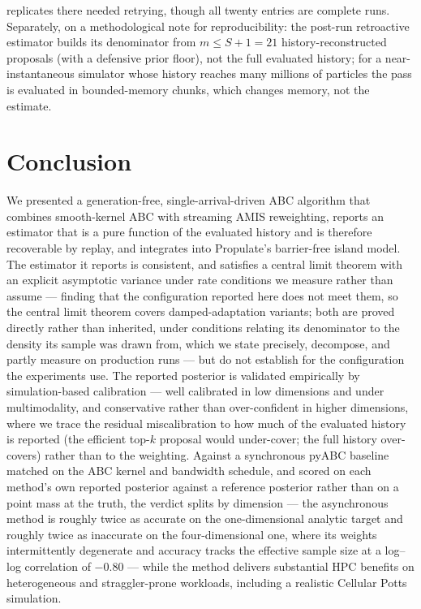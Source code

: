 replicates there needed retrying, though all twenty entries are complete runs. Separately, on a methodological note for reproducibility: the post-run retroactive estimator builds its denominator from $m\le S{+}1=21$ history-reconstructed proposals (with a defensive prior floor), not the full evaluated history; for a near-instantaneous simulator whose history reaches many millions of particles the pass is evaluated in bounded-memory chunks, which changes memory, not the estimate.

\section{Conclusion}\label{sec:conclusion}
We presented a generation-free, single-arrival-driven ABC algorithm that combines smooth-kernel ABC with streaming AMIS reweighting, reports an estimator that is a pure function of the evaluated history and is therefore recoverable by replay, and integrates into Propulate's barrier-free island model. The estimator it reports is consistent, and satisfies a central limit theorem with an explicit asymptotic variance under rate conditions we measure rather than assume --- finding that the configuration reported here does not meet them, so the central limit theorem covers damped-adaptation variants; both are proved directly rather than inherited, under conditions relating its denominator to the density its sample was drawn from, which we state precisely, decompose, and partly measure on production runs --- but do not establish for the configuration the experiments use. The reported posterior is validated empirically by simulation-based calibration --- well calibrated in low dimensions and under multimodality, and conservative rather than over-confident in higher dimensions, where we trace the residual miscalibration to how much of the evaluated history is reported (the efficient top-$k$ proposal would under-cover; the full history over-covers) rather than to the weighting. Against a synchronous pyABC baseline matched on the ABC kernel and bandwidth schedule, and scored on each method's own reported posterior against a reference posterior rather than on a point mass at the truth, the verdict splits by dimension --- the asynchronous method is roughly twice as accurate on the one-dimensional analytic target and roughly twice as inaccurate on the four-dimensional one, where its weights intermittently degenerate and accuracy tracks the effective sample size at a log--log correlation of $-0.80$ --- while the method delivers substantial HPC benefits on heterogeneous and straggler-prone workloads, including a realistic Cellular Potts simulation.

